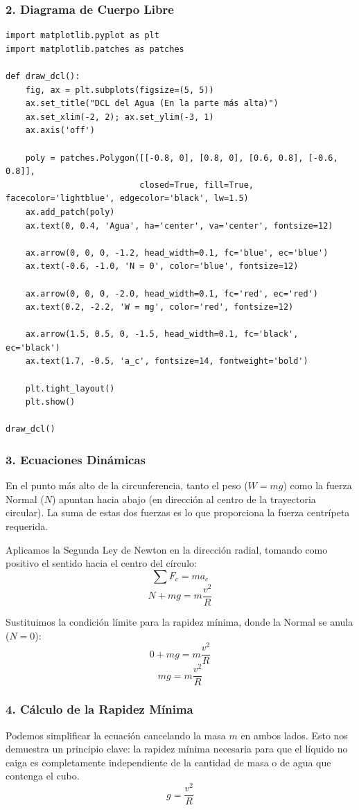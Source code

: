 \documentclass[12pt, a4paper]{article}
\begin{document}
\subsubsection*{2. Diagrama de Cuerpo Libre}
\begin{lstlisting}
import matplotlib.pyplot as plt
import matplotlib.patches as patches

def draw_dcl():
    fig, ax = plt.subplots(figsize=(5, 5))
    ax.set_title("DCL del Agua (En la parte más alta)")
    ax.set_xlim(-2, 2); ax.set_ylim(-3, 1)
    ax.axis('off')
    
    poly = patches.Polygon([[-0.8, 0], [0.8, 0], [0.6, 0.8], [-0.6, 0.8]], 
                           closed=True, fill=True, facecolor='lightblue', edgecolor='black', lw=1.5)
    ax.add_patch(poly)
    ax.text(0, 0.4, 'Agua', ha='center', va='center', fontsize=12)
    
    ax.arrow(0, 0, 0, -1.2, head_width=0.1, fc='blue', ec='blue')
    ax.text(-0.6, -1.0, 'N = 0', color='blue', fontsize=12)
    
    ax.arrow(0, 0, 0, -2.0, head_width=0.1, fc='red', ec='red')
    ax.text(0.2, -2.2, 'W = mg', color='red', fontsize=12)
    
    ax.arrow(1.5, 0.5, 0, -1.5, head_width=0.1, fc='black', ec='black')
    ax.text(1.7, -0.5, 'a_c', fontsize=14, fontweight='bold')

    plt.tight_layout()
    plt.show()

draw_dcl()
\end{lstlisting}

\subsubsection*{3. Ecuaciones Dinámicas}
En el punto más alto de la circunferencia, tanto el peso ($W = mg$) como la fuerza Normal ($N$) apuntan hacia abajo (en dirección al centro de la trayectoria circular). La suma de estas dos fuerzas es lo que proporciona la fuerza centrípeta requerida.

Aplicamos la Segunda Ley de Newton en la dirección radial, tomando como positivo el sentido hacia el centro del círculo:
$$ \sum F_c = m a_c $$
$$ N + mg = m \frac{v^2}{R} $$

Sustituimos la condición límite para la rapidez mínima, donde la Normal se anula ($N = 0$):
$$ 0 + mg = m \frac{v^2}{R} $$
$$ mg = m \frac{v^2}{R} $$

\subsubsection*{4. Cálculo de la Rapidez Mínima}
Podemos simplificar la ecuación cancelando la masa $m$ en ambos lados. Esto nos demuestra un principio clave: la rapidez mínima necesaria para que el líquido no caiga es completamente independiente de la cantidad de masa o de agua que contenga el cubo.
$$ g = \frac{v^2}{R} $$
\end{document}
